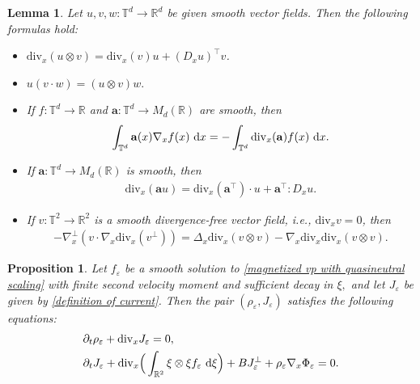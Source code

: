\documentclass[11pt,reqno]{amsart}
\newtheorem{prop}[thm]{Proposition}
\newtheorem{lem}[thm]{Lemma}
\numberwithin{equation}{section}
\def\dd{{\rm d}}
\begin{document}
\begin{lem} \label{elementary identities}
Let $u,v,w:\mathbb{T}^{d}\rightarrow \mathbb{R}^{d}$ be given smooth vector fields. 
Then the following formulas hold{\rm:} 
\begin{itemize}  \item[{\rm(i)}]
$\mathrm{div}_{x}(u\otimes v)=\mathrm{div}_{x}(v)u+(D_xu)^{\top}v$.
 \item[{\rm(ii)}]
$u(v\cdot w)=(u\otimes v)w.$ 
 \item[{\rm(iii)}] If $f:\mathbb{T}^{d}\rightarrow \mathbb{R}$ and 
$\mathbf{a}:\mathbb{T}^{d}\rightarrow M_{d}(\mathbb{R})$ are smooth, 
then 
\begin{align*}
\int_{\mathbb{T}^{d}}\mathbf{a}(x)\nabla_{x}f(x)\ \dd x
=-\int_{\mathbb{T}^{d}}\mathrm{div}_{x}(\mathbf{a})f(x)\ \dd x.     
\end{align*}
 \item[{\rm(iv)}] If $\mathbf{a}:\mathbb{T}^{d}\rightarrow M_{d}(\mathbb{R})$ is smooth, 
 then 
\begin{align*}
\mathrm{div}_{x}(\mathbf{a}u)
=\mathrm{div}_{x}(\mathbf{a}^\top)\cdot u+\mathbf{a}^\top:D_{x}u.
\end{align*}

 \item[{\rm(v)}] If $v:\mathbb{T}^{2}\rightarrow \mathbb{R}^{2}$ 
 is a smooth divergence-free vector field, {\it i.e.}, $\mathrm{div}_{x}v=0$,
 then 
\begin{align*}
-\nabla^{\perp}_{x}(v\cdot \nabla_{x} \mathrm{div}_{x}(v^{\perp}))
=\Delta_{x} \mathrm{div}_{x}(v\otimes v)-\nabla_{x} \mathrm{div}_{x}\mathrm{div}_{x}(v\otimes v).    
\end{align*}
\end{itemize}
\end{lem}

\begin{prop}\label{theorem2.2}
Let $f_{\varepsilon}$ be a smooth solution to \eqref{magnetized vp with quasineutral scaling} with finite second velocity moment and sufficient decay in $\xi,$ and let $J_{\varepsilon}$ be given by \eqref{definition of current}. Then the pair $(\rho_{\varepsilon},J_{\varepsilon})$ satisfies the following equations{\rm:}
\begin{align}
&\partial_{t}\rho_{\varepsilon}+\mathrm{div}_{x}J_{\varepsilon}=0, 
\label{density}\\ 
&\partial_{t}J_{\varepsilon}
+\mathrm{div}_{x}\Big(\int_{\mathbb{R}^{2}}\xi \otimes \xi f_{\varepsilon} \ \dd \xi\Big)+BJ_{\varepsilon}^{\perp}+\rho_{\varepsilon}\nabla_{x} \Phi_{\varepsilon}=0. 
\label{equation for Jepsilon}  
\end{align}
\end{prop}
\end{document}
